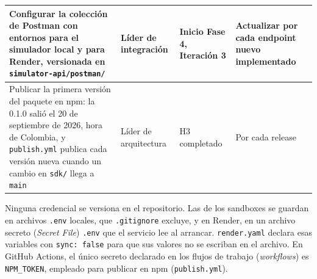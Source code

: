 \begin{center}
\begin{longtable}{|P{0.403}|P{0.167}|P{0.174}|P{0.257}|}
  \hline
  Configurar la colección de Postman con entornos para el simulador local y para Render, versionada en \texttt{simulator-api/postman/} & Líder de integración & Inicio Fase 4, Iteración 3 & Actualizar por cada endpoint nuevo implementado \\
  \hline
  Publicar la primera versión del paquete en npm: la 0.1.0 salió el 20 de septiembre de 2026, hora de Colombia, y \texttt{publish.yml} publica cada versión nueva cuando un cambio en \texttt{sdk/} llega a \texttt{main} & Líder de arquitectura & H3 completado & Por cada release \\
  \hline
\end{longtable}
\end{center}

Ninguna credencial se versiona en el repositorio. Las de los sandboxes se guardan en archivos \texttt{.env} locales, que \texttt{.gitignore} excluye, y en Render, en un archivo secreto (\textit{Secret File}) \texttt{.env} que el servicio lee al arrancar. \texttt{render.yaml} declara esas variables con \texttt{sync: false} para que sus valores no se escriban en el archivo. En GitHub Actions, el único secreto declarado en los flujos de trabajo (\textit{workflows}) es \texttt{NPM\_TOKEN}, empleado para publicar en npm (\texttt{publish.yml}).
